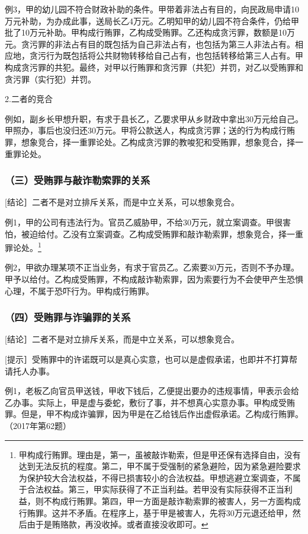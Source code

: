 例3，甲的幼儿园不符合财政补助的条件。甲带着非法占有目的，向民政局申请10万元补助，为办成此事，送局长乙4万元。乙明知甲的幼儿园不符合条件，仍给甲批了10万元补助。甲构成行贿罪，乙构成受贿罪。乙还构成贪污罪，数额是10万元。贪污罪的非法占有目的既包括为自己非法占有，也包括为第三人非法占有。相应地，贪污行为既包括将公共财物转移给自己占有，也包括转移给第三人占有。甲构成贪污罪的共犯。最终，对甲以行贿罪和贪污罪（共犯）并罚，对乙以受贿罪和贪污罪（实行犯）并罚。

2.二者的竞合

例如，副乡长甲想升职，有求于县长乙，乙要求甲从乡财政中拿出30万元给自己。甲照办，事后也没归还30万元。甲将公款送人，构成贪污罪；送的行为构成行贿罪，想象竞合，择一重罪论处。乙构成贪污罪的教唆犯和受贿罪，想象竞合，择一重罪论处。

\subsubsection*{（三）受贿罪与敲诈勒索罪的关系}

[结论］二者不是对立排斥关系，而是中立关系，可以想象竞合。

例1，甲的公司有违法行为。官员乙威胁甲，不给30万元，就立案调查。甲很害怕，被迫给付。乙没有立案调查。乙构成受贿罪和敲诈勒索罪，想象竞合，择一重罪论处。\footnote{甲构成行贿罪。理由是，第一，虽被敲诈勒索，但是甲还保有选择自由，没有达到无法反抗的程度。第二，甲不属于受强制的紧急避险，因为紧急避险要求为保护较大合法权益，不得已损害较小的合法权益。甲想逃避立案调查，不属于合法权益。第三，甲实际获得了不正当利益。若甲没有实际获得不正当利益，则不构成行贿罪。第四，甲一方面是敲诈勒索罪的被害人，另一方面构成行贿罪。这并不矛盾。在程序上，基于甲是被害人，先将30万元退还给甲，然后由于是贿赂款，再没收掉。或者直接没收即可。}

例2，甲欲办理某项不正当业务，有求于官员乙。乙索要30万元，否则不予办理。甲予以给付。乙构成受贿罪，不构成敲诈勒索罪，因为索要行为不会使甲产生恐惧心理，不属于恐吓行为。甲构成行贿罪。

\subsubsection*{（四）受贿罪与诈骗罪的关系}

[结论］二者不是对立排斥关系，而是中立关系，可以想象竞合。

[提示］受贿罪中的许诺既可以是真心实意，也可以是虚假承诺，也即并不打算帮请托人办事。

例1，老板乙向官员甲送钱，甲收下钱后，乙便提出要办的违规事情，甲表示会给乙办事。实际上，甲是虚与委蛇，敷衍了事，并不想真心实意办事。甲构成受贿罪。但是，甲不构成诈骗罪，因为甲是在乙给钱后作出虚假承诺。乙构成行贿罪。（2017年第62题）

